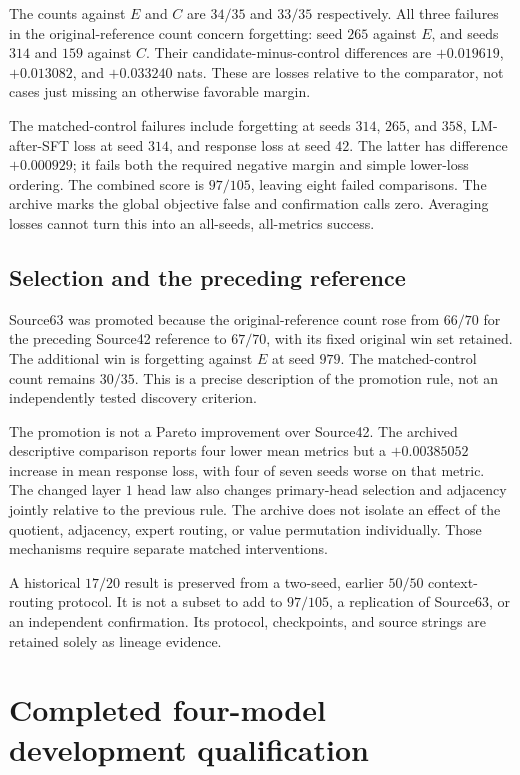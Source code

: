 \documentclass{article}
\begin{document}
The counts against $E$ and $C$ are $34/35$ and $33/35$ respectively. All three failures in the original-reference count concern forgetting: seed $265$ against $E$, and seeds $314$ and $159$ against $C$. Their candidate-minus-control differences are $+0.019619$, $+0.013082$, and $+0.033240$ nats. These are losses relative to the comparator, not cases just missing an otherwise favorable margin.

The matched-control failures include forgetting at seeds $314$, $265$, and $358$, LM-after-SFT loss at seed $314$, and response loss at seed $42$. The latter has difference $+0.000929$; it fails both the required negative margin and simple lower-loss ordering. The combined score is $97/105$, leaving eight failed comparisons. The archive marks the global objective false and confirmation calls zero. Averaging losses cannot turn this into an all-seeds, all-metrics success.

\subsection{Selection and the preceding reference}
Source63 was promoted because the original-reference count rose from $66/70$ for the preceding Source42 reference to $67/70$, with its fixed original win set retained. The additional win is forgetting against $E$ at seed $979$. The matched-control count remains $30/35$. This is a precise description of the promotion rule, not an independently tested discovery criterion.

The promotion is not a Pareto improvement over Source42. The archived descriptive comparison reports four lower mean metrics but a $+0.00385052$ increase in mean response loss, with four of seven seeds worse on that metric. The changed layer $1$ head law also changes primary-head selection and adjacency jointly relative to the previous rule. The archive does not isolate an effect of the quotient, adjacency, expert routing, or value permutation individually. Those mechanisms require separate matched interventions.

A historical $17/20$ result is preserved from a two-seed, earlier $50/50$ context-routing protocol. It is not a subset to add to $97/105$, a replication of Source63, or an independent confirmation. Its protocol, checkpoints, and source strings are retained solely as lineage evidence.

\section{Completed four-model development qualification}
\label{sec:qualification}
\end{document}
